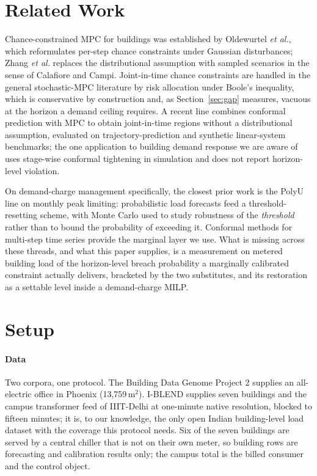 \documentclass[conference]{IEEEtran}
\begin{document}
\section{Related Work}

Chance-constrained MPC for buildings was established by Oldewurtel
\emph{et al.}\cite{oldewurtel2012,oldewurtel2014}, which reformulates per-step
chance constraints under Gaussian disturbances; Zhang \emph{et
al.}\cite{zhang2013scenario} replaces the distributional assumption with
sampled scenarios in the sense of Calafiore and
Campi\cite{calafiore2006scenario}. Joint-in-time chance constraints are handled
in the general stochastic-MPC literature by risk allocation under Boole's
inequality\cite{ono2008risk,paulson2017joint}, which is conservative by
construction and, as Section~\ref{sec:gap} measures, vacuous at the horizon a
demand ceiling requires. A recent line combines conformal prediction with MPC
to obtain joint-in-time regions without a distributional
assumption\cite{lindemann2023safe,vogel2025conformalmpc}, evaluated on
trajectory-prediction and synthetic linear-system benchmarks; the one
application to building demand response we are aware
of\cite{xu2026e2edpc} uses stage-wise conformal tightening in simulation and
does not report horizon-level violation.

On demand-charge management specifically, the closest prior work is the PolyU
line on monthly peak limiting\cite{xu2019adaptive,xu2020exploration}:
probabilistic load forecasts feed a threshold-resetting scheme, with Monte
Carlo used to study robustness of the \emph{threshold} rather than to bound the
probability of exceeding it. Conformal methods for multi-step time series
provide the marginal layer we
use\cite{romano2019cqr,gibbs2021adaptive,stankeviciute2021conformal,sun2024copula}.
What is missing across these threads, and what this paper supplies, is a
measurement on metered building load of the horizon-level breach probability a
marginally calibrated constraint actually delivers, bracketed by the two
substitutes, and its restoration as a settable level inside a demand-charge
MILP.

\section{Setup}
\label{sec:setup}

\paragraph*{Data} Two corpora, one protocol. The Building Data Genome Project
2\cite{miller2020bdg2} supplies an all-electric office in Phoenix
(13{,}759\,m$^2$). I-BLEND\cite{rashid2019iblend} supplies seven buildings and
the campus transformer feed of IIIT-Delhi at one-minute native resolution,
blocked to fifteen minutes; it is, to our knowledge, the only open Indian
building-level load dataset with the coverage this protocol needs. Six of the
seven buildings are served by a central chiller that is not on their own meter,
so building rows are forecasting and calibration results only; the campus total
is the billed consumer and the control object.
\end{document}
